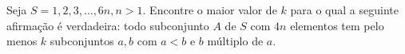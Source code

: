 Seja $S = {1,2,3,\dots,6n}, n > 1$. Encontre o maior valor de $k$ para o qual a seguinte afirmação é verdadeira:
todo subconjunto $A$ de $S$ com $4n$ elementos tem pelo menos $k$ subconjuntos ${a,b}$ com $a < b$ e $b$ múltiplo de $a$.